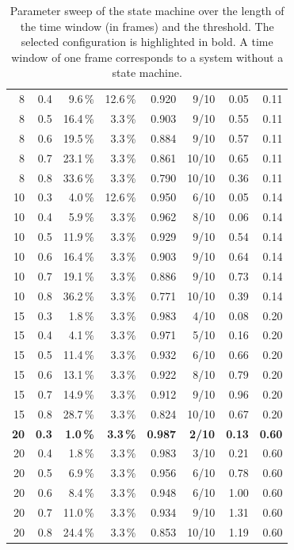 \begin{table}[H]
\begin{tabular}{rrrrrrrr}
        8 & 0.4 & 9.6\,\% & 12.6\,\% & 0.920 & 9/10 & 0.05 & 0.11 \\
        8 & 0.5 & 16.4\,\% & 3.3\,\% & 0.903 & 9/10 & 0.55 & 0.11 \\
        8 & 0.6 & 19.5\,\% & 3.3\,\% & 0.884 & 9/10 & 0.57 & 0.11 \\
        8 & 0.7 & 23.1\,\% & 3.3\,\% & 0.861 & 10/10 & 0.65 & 0.11 \\
        8 & 0.8 & 33.6\,\% & 3.3\,\% & 0.790 & 10/10 & 0.36 & 0.11 \\
        \midrule
        10 & 0.3 & 4.0\,\% & 12.6\,\% & 0.950 & 6/10 & 0.05 & 0.14 \\
        10 & 0.4 & 5.9\,\% & 3.3\,\% & 0.962 & 8/10 & 0.06 & 0.14 \\
        10 & 0.5 & 11.9\,\% & 3.3\,\% & 0.929 & 9/10 & 0.54 & 0.14 \\
        10 & 0.6 & 16.4\,\% & 3.3\,\% & 0.903 & 9/10 & 0.64 & 0.14 \\
        10 & 0.7 & 19.1\,\% & 3.3\,\% & 0.886 & 9/10 & 0.73 & 0.14 \\
        10 & 0.8 & 36.2\,\% & 3.3\,\% & 0.771 & 10/10 & 0.39 & 0.14 \\
        \midrule
        15 & 0.3 & 1.8\,\% & 3.3\,\% & 0.983 & 4/10 & 0.08 & 0.20 \\
        15 & 0.4 & 4.1\,\% & 3.3\,\% & 0.971 & 5/10 & 0.16 & 0.20 \\
        15 & 0.5 & 11.4\,\% & 3.3\,\% & 0.932 & 6/10 & 0.66 & 0.20 \\
        15 & 0.6 & 13.1\,\% & 3.3\,\% & 0.922 & 8/10 & 0.79 & 0.20 \\
        15 & 0.7 & 14.9\,\% & 3.3\,\% & 0.912 & 9/10 & 0.96 & 0.20 \\
        15 & 0.8 & 28.7\,\% & 3.3\,\% & 0.824 & 10/10 & 0.67 & 0.20 \\
        \midrule
        \textbf{20} & \textbf{0.3} & \textbf{1.0\,\%} & \textbf{3.3\,\%} & \textbf{0.987} & \textbf{2/10} & \textbf{0.13} & \textbf{0.60} \\
        20 & 0.4 & 1.8\,\% & 3.3\,\% & 0.983 & 3/10 & 0.21 & 0.60 \\
        20 & 0.5 & 6.9\,\% & 3.3\,\% & 0.956 & 6/10 & 0.78 & 0.60 \\
        20 & 0.6 & 8.4\,\% & 3.3\,\% & 0.948 & 6/10 & 1.00 & 0.60 \\
        20 & 0.7 & 11.0\,\% & 3.3\,\% & 0.934 & 9/10 & 1.31 & 0.60 \\
        20 & 0.8 & 24.4\,\% & 3.3\,\% & 0.853 & 10/10 & 1.19 & 0.60 \\
        \bottomrule
    \end{tabular}
    \caption{Parameter sweep of the state machine over the length of the time window (in frames) and the threshold. The selected configuration is highlighted in bold. A time window of one frame corresponds to a system without a state machine.}
    \label{tab:sm_sweep}
\end{table}

